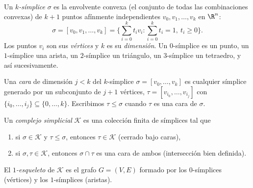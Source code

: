 \begin{definition}[$k$-s\'implice]
\label{def:graphs:simplex}
Un \emph{$k$-s\'implice} $\sigma$ es la envolvente convexa (el conjunto de todas
las combinaciones convexas) de $k+1$ puntos af\'inmente independientes
$v_0, v_1, \dots, v_k$ en $\R^n$:
\[
  \sigma = [v_0, v_1, \dots, v_k]
    = \Big\{ \textstyle\sum_{i=0}^k t_i v_i : \sum_{i=0}^k t_i = 1,\ t_i \ge 0 \Big\}.
\]
Los puntos $v_i$ son sus \emph{v\'ertices} y $k$ es su \emph{dimensi\'on}. Un
$0$-s\'implice es un punto, un $1$-s\'implice una arista, un $2$-s\'implice un
tri\'angulo, un $3$-s\'implice un tetraedro, y as\'i sucesivamente.
\end{definition}

\begin{definition}
\label{def:graphs:face}
Una \emph{cara} de dimensi\'on $j < k$ del $k$-s\'implice
$\sigma = [v_0, \dots, v_k]$ es cualquier s\'implice generado por un subconjunto
de $j+1$ v\'ertices, $\tau = [v_{i_0}, \dots, v_{i_j}]$ con
$\{i_0, \dots, i_j\} \subseteq \{0, \dots, k\}$. Escribimos $\tau \le \sigma$
cuando $\tau$ es una cara de $\sigma$.
\end{definition}

\begin{definition}
\label{def:graphs:complex}
Un \emph{complejo simplicial} $\mathcal{K}$ es una colecci\'on finita de
s\'implices tal que
\begin{enumerate}
  \item si $\sigma \in \mathcal{K}$ y $\tau \le \sigma$, entonces
        $\tau \in \mathcal{K}$ (cerrado bajo caras),
  \item si $\sigma, \tau \in \mathcal{K}$, entonces $\sigma \cap \tau$ es una cara
        de ambos (intersecci\'on bien definida).
\end{enumerate}
El \emph{$1$-esqueleto} de $\mathcal{K}$ es el grafo $G = (V, E)$ formado por los
$0$-s\'implices (v\'ertices) y los $1$-s\'implices (aristas).
\end{definition}

